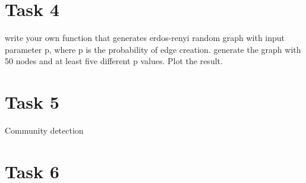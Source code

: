 \documentclass{article}
\begin{document}
\section*{Task 4}
write your own function that generates erdos-renyi random graph with input parameter p, where p is the probability of edge creation. generate the graph with 50 nodes and at least five different p values. Plot the result.  
\section*{Task 5}
Community detection
\section*{Task 6}


 
\end{document}
